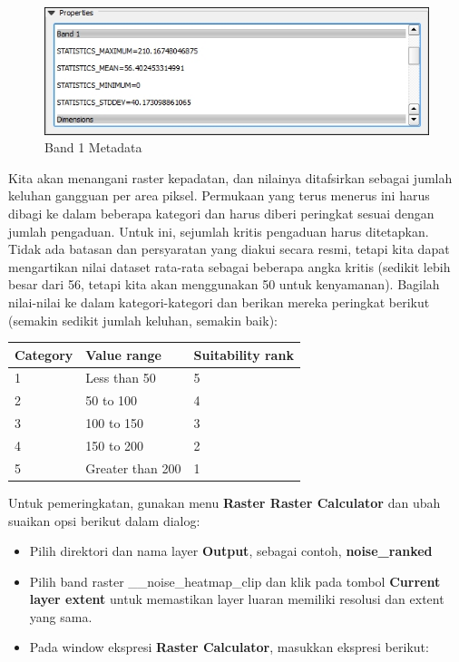 \documentclass[]{book}
\begin{document}
\begin{figure}

{\centering \includegraphics[width=0.7\linewidth]{images/04/fig36} 

}

\caption{Band 1 Metadata}\label{fig:fig1436}
\end{figure}

Kita akan menangani raster kepadatan, dan nilainya ditafsirkan sebagai jumlah keluhan gangguan per area piksel. Permukaan yang terus menerus ini harus dibagi ke dalam beberapa kategori dan harus diberi peringkat sesuai dengan jumlah pengaduan. Untuk ini, sejumlah kritis pengaduan harus ditetapkan. Tidak ada batasan dan persyaratan yang diakui secara resmi, tetapi kita dapat mengartikan nilai dataset rata-rata sebagai beberapa angka kritis (sedikit lebih besar dari 56, tetapi kita akan menggunakan 50 untuk kenyamanan). Bagilah nilai-nilai ke dalam kategori-kategori dan berikan mereka peringkat berikut (semakin sedikit jumlah keluhan, semakin baik):

\begin{longtable}[]{@{}lll@{}}
\toprule
Category & Value range & Suitability rank\tabularnewline
\midrule
\endhead
1 & Less than 50 & 5\tabularnewline
2 & 50 to 100 & 4\tabularnewline
3 & 100 to 150 & 3\tabularnewline
4 & 150 to 200 & 2\tabularnewline
5 & Greater than 200 & 1\tabularnewline
\bottomrule
\end{longtable}

Untuk pemeringkatan, gunakan menu \textbf{Raster \textbar{} Raster Calculator} dan ubah suaikan opsi berikut dalam dialog:

\begin{itemize}
\item
  Pilih direktori dan nama layer \textbf{Output}, sebagai contoh, \textbf{noise\_ranked}
\item
  Pilih band raster \_\_noise\_heatmap\_clip \citet{1__} dan klik pada tombol \textbf{Current layer extent} untuk memastikan layer luaran memiliki resolusi dan extent yang sama.
\item
  Pada window ekspresi \textbf{Raster Calculator}, masukkan ekspresi berikut:
\end{itemize}
\end{document}
